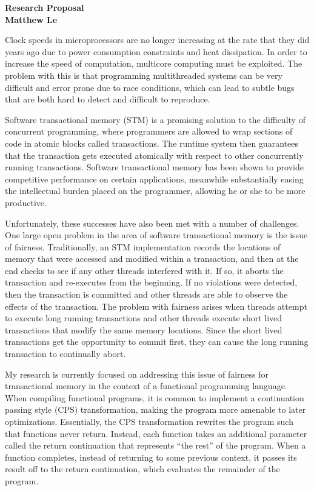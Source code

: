 \documentclass[12pt]{article}
\begin{document}
\begin{center}
{\bf Research Proposal} \\
{\bf Matthew Le} \\
\end{center}


Clock speeds in microprocessors are no longer increasing at the rate that they did years ago due to power consumption constraints and heat dissipation. In order to increase the speed of computation, multicore computing must be exploited. The problem with this is that programming multithreaded systems can be very difficult and error prone due to race conditions, which can lead to subtle bugs that are both hard to detect and difficult to reproduce.

Software transactional memory (STM) is a promising solution to the difficulty of concurrent programming, where programmers are allowed to wrap sections of code in atomic blocks called transactions. The runtime system then guarantees that the transaction gets executed atomically with respect to other concurrently running transactions.  Software transactional memory has been shown to provide competitive performance on certain applications, meanwhile substantially easing the intellectual burden placed on the programmer, allowing he or she to be more productive.

Unfortunately, these successes have also been met with a number of challenges.  One large open problem in the area of software transactional memory is the issue of fairness.  Traditionally, an STM implementation records the locations of memory that were accessed and modified within a transaction, and then at the end checks to see if any other threads interfered with it.  If so, it aborts the transaction and re-executes from the beginning.  If no violations were detected, then the transaction is committed and other threads are able to observe the effects of the transaction.  The problem with fairness arises when threads attempt to execute long running transactions and other threads execute short lived transactions that modify the same memory locations.  Since the short lived transactions get the opportunity to commit first, they can cause the long running transaction to continually abort.

My research is currently focused on addressing this issue of fairness for transactional memory in the context of a functional programming language.  When compiling functional programs, it is common to implement a continuation passing style (CPS) transformation, making the program more amenable to later optimizations.  Essentially, the CPS transformation rewrites the program such that functions never return.  Instead, each function takes an additional parameter called the return continuation that represents ``the rest'' of the program.  When a function completes, instead of returning to some previous context, it passes its result off to the return continuation, which evaluates the remainder of the program.
\end{document}
